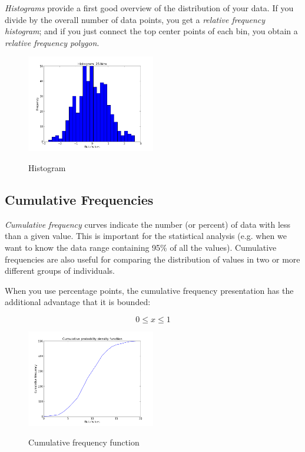 \emph{Histograms} provide a first good overview of the distribution of your data.
If you divide by the overall number of data points, you get a \emph{relative frequency
histogram}; and if you just connect the top center points of each bin, you obtain a
\emph{relative frequency polygon}.

\begin{figure}[ht]
  \centering
  \includegraphics[width=0.5\textwidth]{../Images/Histogram.png}\\
  \caption{Histogram}
\end{figure}

\subsection{Cumulative Frequencies}

\emph{Cumulative frequency} curves indicate the number (or percent) of data with less than a given value. This is important for the statistical analysis (e.g. when we want to know the data range containing 95\% of all the values). Cumulative frequencies
are also useful for comparing the distribution of values in two or more different groups of individuals.

When you use percentage points, the cumulative frequency presentation has the additional advantage that it is bounded:

\begin{equation*}
  0 \leq x \leq 1
\end{equation*}

\begin{figure}[ht]
  \centering
  \includegraphics[width=0.5\textwidth]{../Images/CumulativeFrequencyFunction.png}\\
  \caption{Cumulative frequency function}
\end{figure}

